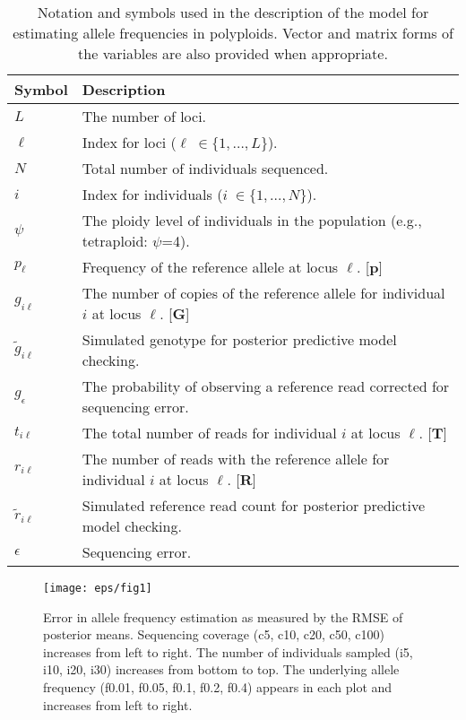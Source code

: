 \documentclass[11pt,english,letterpaper,oneside]{article}
\begin{document}
\begin{table}
\centering
{}
\caption{Notation and symbols used in the description of the model for estimating allele frequencies in polyploids. Vector and matrix forms of the variables are also provided when appropriate.}
\vspace{0.25in}
\bgroup
\def\arraystretch{1.45}
\begin{tabular}[l]{l | l}
\hline
\textbf{Symbol} & \textbf{Description}\\ \hline
$L$ & The number of loci. \\
$\ell$ & Index for loci ($\ell\; \in \{1,\ldots,L\}$). \\
$N$ & Total number of individuals sequenced. \\
$i$ & Index for individuals ($i\; \in \{1,\ldots,N\}$). \\
$\psi$ & The ploidy level of individuals in the population (e.g., tetraploid: $\psi$=4). \\
$p_{\ell}$ & Frequency of the reference allele at locus $\ell$. [$\bm{p}$] \\
$g_{i \ell}$ & The number of copies of the reference allele for individual $i$ at locus $\ell$. [$\bm{G}$] \\
$\tilde{g}_{i \ell}$ & Simulated genotype for posterior predictive model checking. \\
$g_\epsilon$ & The probability of observing a reference read corrected for sequencing error. \\
$t_{i \ell}$ & The total number of reads for individual $i$ at locus $\ell$. [$\bm{T}$] \\
$r_{i \ell}$ & The number of reads with the reference allele for individual $i$ at locus $\ell$. [$\bm{R}$] \\
$\tilde{r}_{i \ell}$ & Simulated reference read count for posterior predictive model checking. \\
$\epsilon$ & Sequencing error. \\
\hline
\end{tabular}
\egroup
\label{table1}
\vspace{0.25in}
\end{table}


\begin{figure}
\centering
\caption{Error in allele frequency estimation as measured by the RMSE of posterior means. Sequencing coverage (c5, c10, c20, c50, c100) increases from left to right. The number of individuals sampled (i5, i10, i20, i30) increases from bottom to top. The underlying allele frequency (f0.01, f0.05, f0.1, f0.2, f0.4) appears in each plot and increases from left to right. }
\vspace{0.25in}
\texttt{[image: eps/fig1]}
\label{fig1:rmse}
\end{figure}
\end{document}
